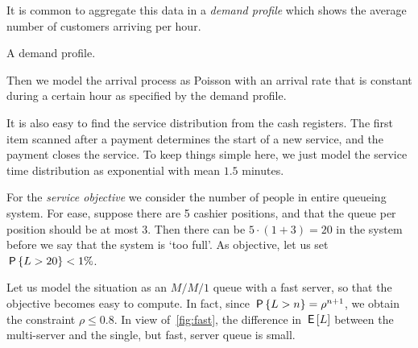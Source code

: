 It is common to aggregate this data in a \emph{demand profile} which shows the average number of customers arriving per hour.
\begin{marginfigure}
\caption{A demand profile.}
\label{fig:loadprofile}
\end{marginfigure}
Then we model the arrival process as Poisson with an arrival rate that is constant during a certain hour as specified by the demand profile.



It is also easy to find the service distribution from the cash registers.
The first item scanned after a payment determines the start of a new service, and the payment closes the service.
To keep things simple here, we just model the service time distribution as exponential with mean $1.5$ minutes.

For the \emph{service objective} we consider the number of people in entire queueing system.
For ease, suppose there are 5 cashier positions, and that the queue per position should be at most 3.
Then there can be $5\cdot (1 + 3) = 20$ in the system before we say that the system is `too full'. As objective, let us set $\,\mathsf{P}\left\{L>20\right\} < 1\%$. 

Let us model the situation as an $M/M/1$ queue with a fast server, so that the objective becomes easy to compute.
In fact, since $\,\mathsf{P}\left\{L>n\right\} = \rho^{n+1}$, we obtain the constraint $\rho\leq 0.8$.
In view of~\cref{fig:fast}, the difference in $\,\mathsf{E}\left[L\right]$ between the multi-server and the single, but fast, server queue is small.


